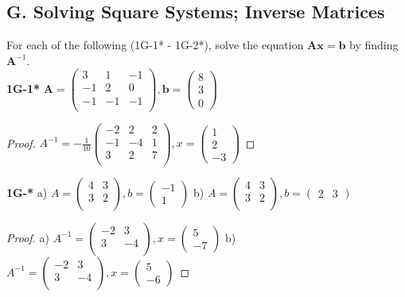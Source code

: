 \documentclass{article}
\begin{document}
\subsection{G. Solving Square Systems; Inverse Matrices}
For each of the following (1G-1* - 1G-2*), solve the equation $\mathbf{Ax} = \mathbf{b}$ by finding $\mathbf{A}^{-1}$.
\\\textbf{1G-1*}
$
\mathbf{A} =
\begin{pmatrix}
3 & 1 & -1 \\
-1 & 2 & 0 \\
-1 & -1 & -1 \\
\end{pmatrix}
,
\mathbf{b} =
\begin{pmatrix}
8 \\ 3 \\ 0
\end{pmatrix}
$
\begin{proof}
$
A^{-1} = -\frac{1}{10}
\begin{pmatrix}
-2 & 2 & 2 \\
-1 & -4 & 1 \\
3 & 2 & 7 \\
\end{pmatrix}
,
x = \begin{pmatrix}
1 \\ 2 \\ -3
\end{pmatrix}
$
\end{proof}
\textbf{1G-*} a) 
$
A = \begin{pmatrix}
4 & 3 \\
3 & 2 \\
\end{pmatrix}
,
b = \begin{pmatrix}
-1 \\ 1
\end{pmatrix}
$
b)
$
A = 
\begin{pmatrix}
4 & 3 \\
3 & 2 \\
\end{pmatrix}
,
b = \begin{pmatrix}
2 & 3
\end{pmatrix}
$
\begin{proof}
a) $A^{-1} = \begin{pmatrix}
-2 & 3 \\
3 & -4 \\
\end{pmatrix}
,
x = \begin{pmatrix}
5 \\ -7
\end{pmatrix}
$
b) $A^{-1} = \begin{pmatrix}
-2 & 3 \\
3 & -4 \\
\end{pmatrix}
,
x = \begin{pmatrix}
5 \\ -6
\end{pmatrix}
$
\end{proof}
\end{document}

